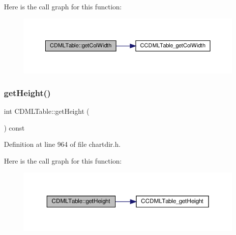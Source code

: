 Here is the call graph for this function\+:
\nopagebreak
\begin{figure}[H]
\begin{center}
\leavevmode
\includegraphics[width=350pt]{class_c_d_m_l_table_a9f6a813b023cbce808d94adef12533e6_cgraph}
\end{center}
\end{figure}
\mbox{\label{class_c_d_m_l_table_a9783be404eca3a6685dd0ea58dcbb27d}} 
\subsubsection{\texorpdfstring{get\+Height()}{getHeight()}}
{\footnotesize\ttfamily int C\+D\+M\+L\+Table\+::get\+Height (\begin{DoxyParamCaption}{ }\end{DoxyParamCaption}) const\hspace{0.3cm}{\ttfamily [inline]}}



Definition at line 964 of file chartdir.\+h.

Here is the call graph for this function\+:
\nopagebreak
\begin{figure}[H]
\begin{center}
\leavevmode
\includegraphics[width=350pt]{class_c_d_m_l_table_a9783be404eca3a6685dd0ea58dcbb27d_cgraph}
\end{center}
\end{figure}
\mbox{\label{class_c_d_m_l_table_aef39ffb95d09fd1cf91e9c982e5d835f}} 
